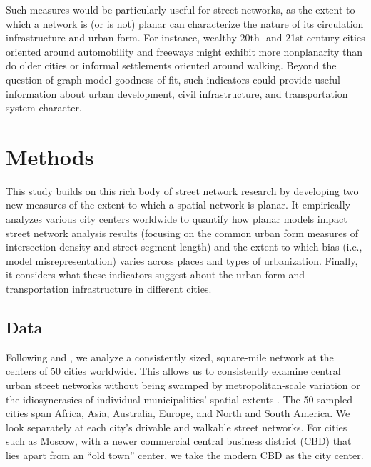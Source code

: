 \documentclass[Afour,sageh,times]{sagej}
\begin{document}
Such measures would be particularly useful for street networks, as the extent to which a network is (or is not) planar can characterize the nature of its circulation infrastructure and urban form. For instance, wealthy 20th- and 21st-century cities oriented around automobility and freeways might exhibit more nonplanarity than do older cities or informal settlements oriented around walking. Beyond the question of graph model goodness-of-fit, such indicators could provide useful information about urban development, civil infrastructure, and transportation system character.



\section{Methods}

This study builds on this rich body of street network research by developing two new measures of the extent to which a spatial network is planar. It empirically analyzes various city centers worldwide to quantify how planar models impact street network analysis results (focusing on the common urban form measures of intersection density and street segment length) and the extent to which bias (i.e., model misrepresentation) varies across places and types of urbanization. Finally, it considers what these indicators suggest about the urban form and transportation infrastructure in different cities.

\subsection{Data}

Following \citet{jacobs_great_1995} and \citet{cardillo_structural_2006}, we analyze a consistently sized, square-mile network at the centers of 50 cities worldwide. This allows us to consistently examine central urban street networks without being swamped by metropolitan-scale variation or the idiosyncrasies of individual municipalities' spatial extents \citep{gil_street_2017}. The 50 sampled cities span Africa, Asia, Australia, Europe, and North and South America. We look separately at each city's drivable and walkable street networks. For cities such as Moscow, with a newer commercial central business district (CBD) that lies apart from an \enquote{old town} center, we take the modern CBD as the city center.
\end{document}
